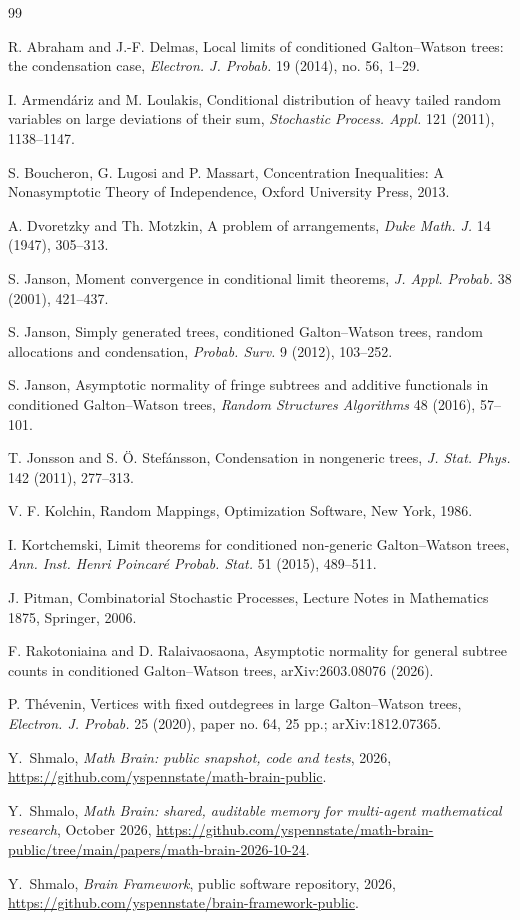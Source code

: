 \documentclass[11pt]{amsart}
\theoremstyle{definition}
\begin{document}
\begin{thebibliography}{99}

 R. Abraham and J.-F. Delmas, Local limits of conditioned Galton--Watson trees: the condensation case, \emph{Electron. J. Probab.} 19 (2014), no. 56, 1--29.

 I. Armend\'ariz and M. Loulakis, Conditional distribution of heavy tailed random variables on large deviations of their sum, \emph{Stochastic Process. Appl.} 121 (2011), 1138--1147.

 S. Boucheron, G. Lugosi and P. Massart, Concentration Inequalities: A Nonasymptotic Theory of Independence, Oxford University Press, 2013.

 A. Dvoretzky and Th. Motzkin, A problem of arrangements, \emph{Duke Math. J.} 14 (1947), 305--313.

 S. Janson, Moment convergence in conditional limit theorems, \emph{J. Appl. Probab.} 38 (2001), 421--437.

 S. Janson, Simply generated trees, conditioned Galton--Watson trees, random allocations and condensation, \emph{Probab. Surv.} 9 (2012), 103--252.

 S. Janson, Asymptotic normality of fringe subtrees and additive functionals in conditioned Galton--Watson trees, \emph{Random Structures Algorithms} 48 (2016), 57--101.

 T. Jonsson and S. \"O. Stef\'ansson, Condensation in nongeneric trees, \emph{J. Stat. Phys.} 142 (2011), 277--313.

 V. F. Kolchin, Random Mappings, Optimization Software, New York, 1986.

 I. Kortchemski, Limit theorems for conditioned non-generic Galton--Watson trees, \emph{Ann. Inst. Henri Poincar\'e Probab. Stat.} 51 (2015), 489--511.

 J. Pitman, Combinatorial Stochastic Processes, Lecture Notes in Mathematics 1875, Springer, 2006.

 F. Rakotoniaina and D. Ralaivaosaona, Asymptotic normality for general subtree counts in conditioned Galton--Watson trees, arXiv:2603.08076 (2026).

 P. Th\'evenin, Vertices with fixed outdegrees in large Galton--Watson trees, \emph{Electron. J. Probab.} 25 (2020), paper no. 64, 25 pp.; arXiv:1812.07365.

 Y.~Shmalo, \emph{Math Brain: public snapshot, code and tests}, 2026, \url{https://github.com/yspennstate/math-brain-public}.

 Y.~Shmalo, \emph{Math Brain: shared, auditable memory for multi-agent mathematical research}, October 2026, \url{https://github.com/yspennstate/math-brain-public/tree/main/papers/math-brain-2026-10-24}.

 Y.~Shmalo, \emph{Brain Framework}, public software repository, 2026, \url{https://github.com/yspennstate/brain-framework-public}.

\end{thebibliography}
\end{document}

